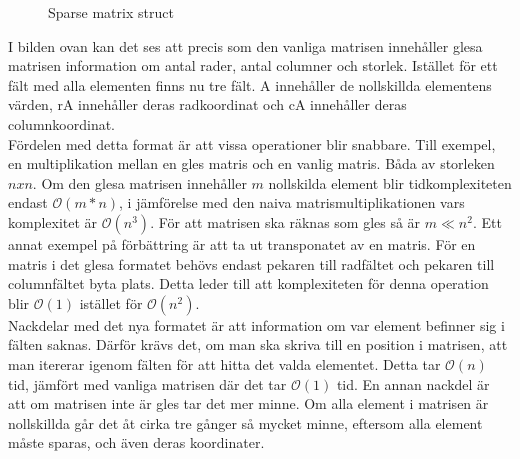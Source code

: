 \begin{figure}[H]

\caption{Sparse matrix struct}
\label{fig:sparse_struct}
\end{figure}

I bilden ovan kan det ses att precis som den vanliga matrisen innehåller glesa matrisen information om antal rader, antal columner och storlek. Istället för ett fält med alla elementen finns nu tre fält. A innehåller de nollskillda elementens värden, rA innehåller deras radkoordinat och cA innehåller deras columnkoordinat. \\
Fördelen med detta format är att vissa operationer blir snabbare. Till exempel, en multiplikation mellan en gles matris och en vanlig matris. Båda av storleken $nxn$. Om den glesa matrisen innehåller $m$ nollskilda element blir tidkomplexiteten endast $\mathcal{O}(m*n)$, i jämförelse med den naiva matrismultiplikationen vars komplexitet är $\mathcal{O}(n^3)$. För att matrisen ska räknas som gles så är $m \ll n^2$.
Ett annat exempel på förbättring är att ta ut transponatet av en matris. För en matris i det glesa formatet behövs endast pekaren till radfältet och pekaren till columnfältet byta plats. Detta leder till att komplexiteten för denna operation blir $\mathcal{O}(1)$ istället för $\mathcal{O}(n^2)$. \\
Nackdelar med det nya formatet är att information om var element befinner sig i fälten saknas. Därför krävs det, om man ska skriva till en position i matrisen, att man itererar igenom fälten för att hitta det valda elementet. Detta tar $\mathcal{O}(n)$ tid, jämfört med vanliga matrisen där det tar $\mathcal{O}(1)$ tid.
En annan nackdel är att om matrisen inte är gles tar det mer minne. Om alla element i matrisen är nollskillda går det åt cirka tre gånger så mycket minne, eftersom alla element måste sparas, och även deras koordinater.

